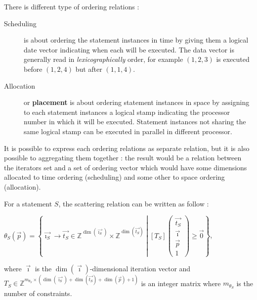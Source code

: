 \documentclass[paper=a4, fontsize=11.5pt]{scrartcl}
\numberwithin{equation}{section}        %
\numberwithin{figure}{section}          %
\numberwithin{table}{section}               %
\begin{document}
        There is different type of ordering relations :
        \begin{description}
            \item[Scheduling] is about ordering the statement instances in time by
                giving them a logical date vector indicating when each will be executed.
                The data vector is generally read in \textit{lexicographically} order, for example
                $(1,2,3)$ is executed before $(1,2,4)$ but after $(1,1,4)$.
            \item[Allocation] or \textbf{placement} is about ordering statement instances
                in space by assigning to each statement instances a logical stamp
                indicating the processor number in which it will be executed.
                Statement instances not sharing the same logical stamp can be
                executed in parallel in different processor.
        \end{description}

        It is possible to express each ordering relations as separate relation,
        but it is also possible to aggregating them together : the result would be
        a relation between the iterators set and a set of ordering vector which
        would have some dimensions allocated to time ordering (scheduling) and
        some other to space ordering (allocation).

        For a statement $S$, the scattering relation can be written as follow :
        \begin{center}
            $\theta_S(\vec{p}) = \left\{\vec{\imath_S} \to \vec{t_S} \in \mathbb{Z}^{\dim(\vec{\imath_S})}\times\mathbb{Z}^{\dim(\vec{t_S})}
            \middle|
            \left[T_S\right]\begin{pmatrix}\vec{t_S}\\ \vec{\imath} \\ \vec{p} \\ 1\end{pmatrix}
            \geq \vec{0}
            \right\}$,
        \end{center}
        where $\vec{\imath}$ is the $\dim(\vec{\imath})$-dimensional iteration vector
        and $T_S \in \mathbb{Z}^{m_{\theta_S}\times(\dim(\vec{\imath_S})+\dim(\vec{t_S})+\dim(\vec{p})+1)}$
        is an integer matrix where $m_{\theta_S}$ is the number of constraints.
\end{document}
